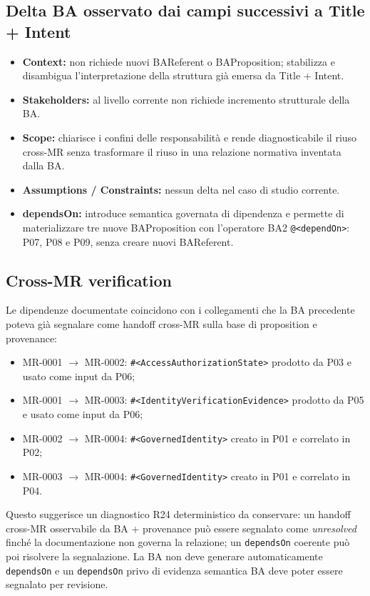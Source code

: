 \documentclass[11pt,a4paper]{article}
\makeatletter
\newcommand{\bnon}[1]{\texttt{\#<#1>}}
\newcommand{\baop}[1]{\texttt{@<#1>}}
\newenvironment{compactitems}{\begin{itemize}[leftmargin=1.35em,itemsep=0.1em,topsep=0.2em,parsep=0pt]}{\end{itemize}}
\makeatother
\begin{document}
\subsection*{Delta BA osservato dai campi successivi a Title + Intent}
\begin{compactitems}
  \item \textbf{Context:} non richiede nuovi BAReferent o BAProposition; stabilizza e disambigua l'interpretazione della struttura gi\`a emersa da Title + Intent.
  \item \textbf{Stakeholders:} al livello corrente non richiede incremento strutturale della BA.
  \item \textbf{Scope:} chiarisce i confini delle responsabilit\`a e rende diagnosticabile il riuso cross-MR senza trasformare il riuso in una relazione normativa inventata dalla BA.
  \item \textbf{Assumptions / Constraints:} nessun delta nel caso di studio corrente.
  \item \textbf{dependsOn:} introduce semantica governata di dipendenza e permette di materializzare tre nuove BAProposition con l'operatore BA2 \baop{dependOn}: P07, P08 e P09, senza creare nuovi BAReferent.
\end{compactitems}

\subsection*{Cross-MR verification}
Le dipendenze documentate coincidono con i collegamenti che la BA precedente poteva gi\`a segnalare come handoff cross-MR sulla base di proposition e provenance:

\begin{compactitems}
  \item MR-0001 $\rightarrow$ MR-0002: \bnon{AccessAuthorizationState} prodotto da P03 e usato come input da P06;
  \item MR-0001 $\rightarrow$ MR-0003: \bnon{IdentityVerificationEvidence} prodotto da P05 e usato come input da P06;
  \item MR-0002 $\rightarrow$ MR-0004: \bnon{GovernedIdentity} creato in P01 e correlato in P02;
  \item MR-0003 $\rightarrow$ MR-0004: \bnon{GovernedIdentity} creato in P01 e correlato in P04.
\end{compactitems}

Questo suggerisce un diagnostico R24 deterministico da conservare: un handoff cross-MR osservabile da BA + provenance pu\`o essere segnalato come \emph{unresolved} finch\'e la documentazione non governa la relazione; un \texttt{dependsOn} coerente pu\`o poi risolvere la segnalazione. La BA non deve generare automaticamente \texttt{dependsOn} e un \texttt{dependsOn} privo di evidenza semantica BA deve poter essere segnalato per revisione.
\end{document}
